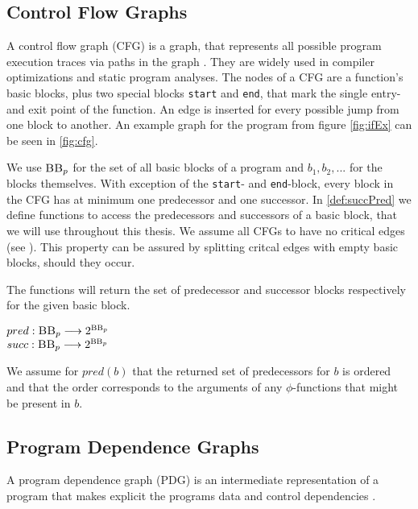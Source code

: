 \subsection{Control Flow Graphs}
A control flow graph (CFG) is a graph, that represents all possible program execution traces via paths in the graph \cite{allen70}. They are widely used in compiler optimizations and static program analyses. The nodes of a CFG are a function's basic blocks, plus two special blocks \texttt{start} and \texttt{end}, that mark the single entry- and exit point of the function. An edge is inserted for every possible jump from one block to another. An example graph for the program from figure \ref{fig:ifEx} can be seen in \ref{fig:cfg}.

We use $\mbb_p$ for the set of all basic blocks of a program \p and $b_1, b_2, ...$ for the blocks themselves. With exception of the \texttt{start}- and \texttt{end}-block, every block in the CFG has at minimum one predecessor and one successor. In \ref{def:succPred} we define functions to access the predecessors and successors of a basic block, that we will use throughout this thesis. We assume all CFGs to have no critical edges (see \cite{dragoonBook}). This property can be assured by splitting critcal edges with empty basic blocks, should they occur. 

\begin{definition}\label{def:succPred}
    The functions will return the set of predecessor and successor blocks respectively for the given basic block.
    \begin{center}
        $pred: \textsc{BB}_p \longrightarrow 2^{\textsc{BB}_p}$\\
        $succ: \textsc{BB}_p \longrightarrow 2^{\textsc{BB}_p}$
    \end{center}
    We assume for $pred(b)$ that the returned set of predecessors for $b$ is ordered and that the order corresponds to the arguments of any $\phi$-functions that might be present in $b$.
\end{definition}

\subsection{Program Dependence Graphs}
A program dependence graph (PDG) is an intermediate representation of a program that makes explicit the programs data and control dependencies \cite{ferrante87}.  

